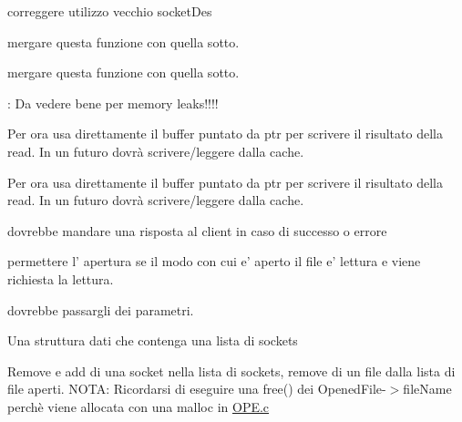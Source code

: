 
\begin{DoxyRefList}
\item[\label{todo__todo000006}%
\hypertarget{todo__todo000006}{}%
Globale \hyperlink{OPE_8c_af1f79690eec0a7727a519ba59a891762}{create\+Control\+Sock} (int port\+No, int socket\+Id)]correggere utilizzo vecchio socket\+Des  
\item[\label{todo__todo000002}%
\hypertarget{todo__todo000002}{}%
Globale \hyperlink{CommandsHandler_8h_a919c7f4b4bcb820f1d6566238178390e}{get\+Command\+I\+D} (char $\ast$)]mergare questa funzione con quella sotto.  
\item[\label{todo__todo000002}%
\hypertarget{todo__todo000002}{}%
Globale \hyperlink{CommandsHandler_8h_a919c7f4b4bcb820f1d6566238178390e}{get\+Command\+I\+D} (char $\ast$)]mergare questa funzione con quella sotto.  
\item[\label{todo__todo000005}%
\hypertarget{todo__todo000005}{}%
Globale \hyperlink{OPE_8c_a6eccb6ec6ec9c8375e70ab4088b511a5}{handle\+Open\+Command} (char $\ast$command, int socket)]\+: Da vedere bene per memory leaks!!!!  
\item[\label{todo__todo000001}%
\hypertarget{todo__todo000001}{}%
Globale \hyperlink{Client_2READ_8c_aa4b63039ca9686f5666ce6bbb33317d7}{mydfs\+\_\+read} (\hyperlink{structMyDFSId}{My\+D\+F\+S\+Id} $\ast$id, int pos, void $\ast$ptr, unsigned int size)]Per ora usa direttamente il buffer puntato da ptr per scrivere il risultato della read. In un futuro dovrà scrivere/leggere dalla cache. 
\item[\label{todo__todo000001}%
\hypertarget{todo__todo000001}{}%
Globale \hyperlink{Client_2READ_8c_aa4b63039ca9686f5666ce6bbb33317d7}{mydfs\+\_\+read} (\hyperlink{structMyDFSId}{My\+D\+F\+S\+Id} $\ast$id, int pos, void $\ast$ptr, unsigned int size)]Per ora usa direttamente il buffer puntato da ptr per scrivere il risultato della read. In un futuro dovrà scrivere/leggere dalla cache. 
\item[\label{todo__todo000004}%
\hypertarget{todo__todo000004}{}%
File \hyperlink{OPE_8c}{O\+P\+E.c} ]dovrebbe mandare una risposta al client in caso di successo o errore 

permettere l' apertura se il modo con cui e' aperto il file e' lettura e viene richiesta la lettura.  
\item[\label{todo__todo000007}%
\hypertarget{todo__todo000007}{}%
Globale \hyperlink{server_8c_a5e7b14672f9e2c9fa99b363004afb8e8}{spawn\+Thread} ()]dovrebbe passargli dei parametri.  
\item[\label{todo__todo000008}%
\hypertarget{todo__todo000008}{}%
File \hyperlink{StruttureDati_8c}{Strutture\+Dati.c} ]Una struttura dati che contenga una lista di sockets 

Remove e add di una socket nella lista di sockets, remove di un file dalla lista di file aperti. N\+O\+T\+A\+: Ricordarsi di eseguire una free() dei Opened\+File-\/$>$file\+Name perchè viene allocata con una malloc in \hyperlink{OPE_8c}{O\+P\+E.\+c}
\end{DoxyRefList}